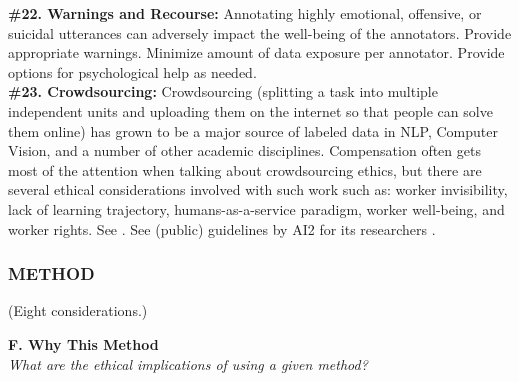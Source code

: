 \documentclass{clv3}
\begin{document}
\noindent \textbf{\#22. Warnings and Recourse:} Annotating highly emotional, offensive, or suicidal utterances can adversely impact the well-being of the annotators. Provide appropriate warnings. Minimize amount of data exposure per annotator. Provide options for psychological help as needed.\\

\noindent \textbf{\#23. Crowdsourcing:} Crowdsourcing (splitting a task into multiple independent units and uploading them on the internet so that people can solve them online) has grown to be a major source of labeled data in NLP, Computer Vision, and a number of other academic disciplines. Compensation often gets most of the attention when talking about crowdsourcing ethics, but there are several ethical considerations involved with such work such as: worker invisibility, lack of learning trajectory, humans-as-a-service paradigm, worker well-being, and worker rights. See
\citet{dolmaya2011ethics,fort-etal-2011-last,standing2018ethical,irani2013turkopticon,shmueli2021beyond}.
See (public) guidelines by AI2 for its researchers \cite{ai2_2019}.\\[-2pt]


\subsubsection{METHOD} (Eight considerations.)\\
\label{sec:method}


\noindent \textbf{F. Why This Method}\\[2pt]
\textit{What are the ethical implications of using a given method?}\\[-2pt]
\end{document}
